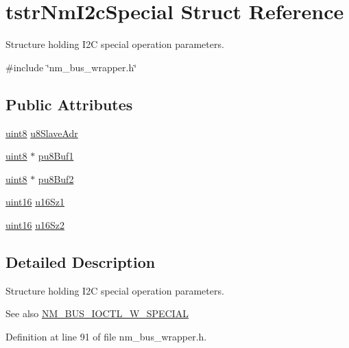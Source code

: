 \hypertarget{structtstrNmI2cSpecial}{}\section{tstr\+Nm\+I2c\+Special Struct Reference}
\label{structtstrNmI2cSpecial}


Structure holding I2C special operation parameters.  




{\ttfamily \#include \char`\"{}nm\+\_\+bus\+\_\+wrapper.\+h\char`\"{}}

\subsection*{Public Attributes}
\begin{DoxyCompactItemize}
\item 
\hyperlink{group__DataT_ga4df709a77647e870bbf1d955b8edc9a6}{uint8} \hyperlink{structtstrNmI2cSpecial_a6d5ae4c091612c4a530f76e8aa83dc3f}{u8\+Slave\+Adr}
\item 
\hyperlink{group__DataT_ga4df709a77647e870bbf1d955b8edc9a6}{uint8} $\ast$ \hyperlink{structtstrNmI2cSpecial_a4f89ccd58c1642e11c466d35c7338dca}{pu8\+Buf1}
\item 
\hyperlink{group__DataT_ga4df709a77647e870bbf1d955b8edc9a6}{uint8} $\ast$ \hyperlink{structtstrNmI2cSpecial_aa20afa1ba217ce6d90a249aa279b84b0}{pu8\+Buf2}
\item 
\hyperlink{group__DataT_ga1daa745171fc6e31d942c161422a76f9}{uint16} \hyperlink{structtstrNmI2cSpecial_aeb07c4e8ea1caeb52f94a2f57b3eefcf}{u16\+Sz1}
\item 
\hyperlink{group__DataT_ga1daa745171fc6e31d942c161422a76f9}{uint16} \hyperlink{structtstrNmI2cSpecial_a852145ab9573a13c932ba625d2f2ba17}{u16\+Sz2}
\end{DoxyCompactItemize}


\subsection{Detailed Description}
Structure holding I2C special operation parameters. 

\begin{DoxySeeAlso}{See also}
\hyperlink{nm__bus__wrapper_8h_a7fa13881ba1099dbde9b22b6f2e06b5e}{N\+M\+\_\+\+B\+U\+S\+\_\+\+I\+O\+C\+T\+L\+\_\+\+W\+\_\+\+S\+P\+E\+C\+I\+AL} 
\end{DoxySeeAlso}


Definition at line 91 of file nm\+\_\+bus\+\_\+wrapper.\+h.



